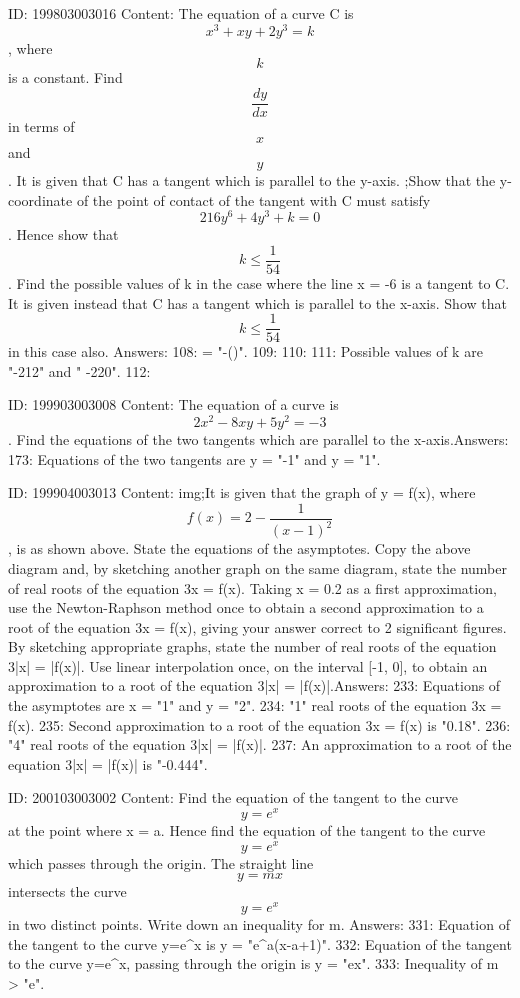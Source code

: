 \documentclass{article}
\begin{document}
ID: 199803003016
Content:
The equation of a curve C is $$x^3 + xy + 2 y^3 = k$$, where $$k$$ is a constant. Find  $$\frac{dy}{dx}$$ in terms of $$x$$ and $$y$$. It is given that C has a tangent which is parallel to the y-axis. ;Show that the y-coordinate of the point of contact of the tangent with C must satisfy $$216 y^6 + 4 y^3 + k = 0$$. Hence show that  $$k \leq \frac{1}{54}$$. Find the possible values of k in the case where the line x = -6 is a tangent to C. It is given instead that C has a tangent which is parallel to the x-axis. Show that $$k \leq \frac{1}{54}$$ in this case also. Answers:
108:  = "-()".
109: 
110: 
111: Possible values of k are "-212" and " -220".
112: 

ID: 199903003008
Content:
The equation of a curve is \[2x^2 - 8xy + 5y^2 = -3\]. Find the equations of the two tangents which are parallel to the x-axis.Answers:
173: Equations of the two tangents are y = "-1" and y = "1".

ID: 199904003013
Content:
img;It is given that the graph of y = f(x), where \[f(x) = 2 - \frac {1}{(x-1)^2}\], is as shown above. State the equations of the asymptotes. Copy the above diagram and, by sketching another graph on the same diagram, state the number of real roots of the equation 3x = f(x). Taking x = 0.2 as a first approximation, use the Newton-Raphson method once to obtain a second approximation to a root of the equation 3x = f(x), giving your answer correct to 2 significant figures. By sketching appropriate graphs, state the number of real roots of the equation 3|x| = |f(x)|. Use linear interpolation once, on the interval [-1, 0], to obtain an approximation to a root of the equation 3|x| = |f(x)|.Answers:
233: Equations of the asymptotes are x = "1" and y = "2".
234: "1" real roots of the equation 3x = f(x).
235: Second approximation to a root of the equation 3x = f(x) is "0.18".
236: "4" real roots of the equation 3|x| = |f(x)|.
237: An approximation to a root of the equation 3|x| = |f(x)| is "-0.444".

ID: 200103003002
Content:
Find the equation of the tangent to the curve  $$y = e^x $$ at the point where x = a. Hence find the equation of the tangent to the curve  $$y = e^x $$ which passes through the origin. The straight line $$y = mx$$ intersects the curve  $$y = e^x $$ in two distinct points. Write down an inequality for m. Answers:
331: Equation of the tangent to the curve y=e^{x} is y = "e^{a}(x-a+1)".
332: Equation of the tangent to the curve y=e^{x}, passing through the origin is y = "ex".
333: Inequality of m > "e".
\end{document}
